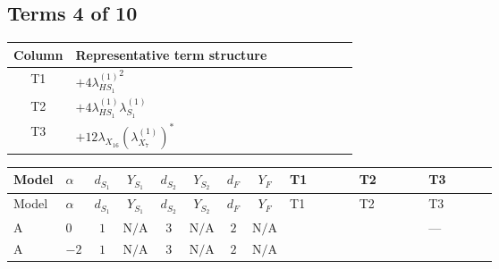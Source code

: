\documentclass[8pt]{article}
\begin{document}
\begin{landscape}
\subsection*{Terms 4 of 10}
\begin{center}
\begin{tabular}{@{}c >{\raggedright\arraybackslash}p{0.82\linewidth}@{}}
\toprule
Column & Representative term structure \\
\midrule
T1 & \(\displaystyle +4 {\lambda_{HS_1}^{(1)}}^2\) \\
\midrule
T2 & \(\displaystyle +4 {\lambda_{HS_1}^{(1)}} {\lambda_{S_1}^{(1)}}\) \\
\midrule
T3 & \(\displaystyle +12 {\lambda_{X_{16}}} \left({\lambda_{X_{7}}^{(1)}}\right)^{*}\) \\
\midrule
\bottomrule
\end{tabular}
\end{center}
\smallskip
\tiny
\begin{longtable}{@{}llcccccc >{\raggedright\arraybackslash}p{0.21\linewidth} >{\raggedright\arraybackslash}p{0.21\linewidth} >{\raggedright\arraybackslash}p{0.21\linewidth}@{}}
\toprule
Model & $\alpha$ & $d_{S_1}$ & $Y_{S_1}$ & $d_{S_2}$ & $Y_{S_2}$ & $d_F$ & $Y_F$ & T1 & T2 & T3 \\
\midrule
\endfirsthead
\toprule
Model & $\alpha$ & $d_{S_1}$ & $Y_{S_1}$ & $d_{S_2}$ & $Y_{S_2}$ & $d_F$ & $Y_F$ & T1 & T2 & T3 \\
\midrule
\endhead
A & $0$ & $1$ & $\text{N/A}$ & $3$ & $\text{N/A}$ & $2$ & $\text{N/A}$ & \scriptsize\adjustbox{max width=\linewidth}{$\begin{gathered} +4 {\lambda_{HS_1}^{(1)}}^2\end{gathered}$} & \scriptsize\adjustbox{max width=\linewidth}{$\begin{gathered} +4 {\lambda_{HS_1}^{(1)}} {\lambda_{S_1}^{(1)}}\end{gathered}$} & --- \\
\midrule
A & $-2$ & $1$ & $\text{N/A}$ & $3$ & $\text{N/A}$ & $2$ & $\text{N/A}$ & \scriptsize\adjustbox{max width=\linewidth}{$\begin{gathered} +4 {\lambda_{HS_1}^{(1)}}^2\end{gathered}$} & \scriptsize\adjustbox{max width=\linewidth}{$\begin{gathered} +4 {\lambda_{HS_1}^{(1)}} {\lambda_{S_1}^{(1)}}\end{gathered}$} & \scriptsize\adjustbox{max width=\linewidth}{$\begin{gathered} +12 {\lambda_{X_{16}}} \left({\lambda_{X_{7}}^{(1)}}\right)^{*}\end{gathered}$} \\

\end{longtable}
\end{landscape}
\end{document}
